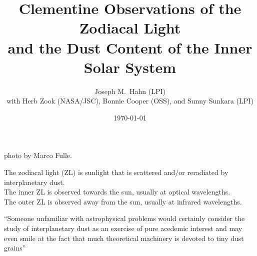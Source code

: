\documentclass[20pt,35mmSlide,landscape]{foils}
\title{\vspace*{-5ex}Clementine Observations of the Zodiacal
Light\\
and the Dust Content of the Inner Solar System\vspace*{1.5ex}}
\author{Joseph M.\ Hahn (LPI)\vspace*{4ex}\\
with Herb Zook (NASA/JSC), Bonnie Cooper (OSS),
and Sunny Sunkara (LPI)\vspace*{3ex}}
\date{\today}
\begin{document}
\maketitle

\pagecolor{light-yellow}

\begin{figure}
\vspace*{-0.75in}\centerline{}
\end{figure}

\pagecolor{light-yellow}

\parbox{10in}{
\parbox{5in}{
\begin{figure}[t]
\vspace*{-6ex}
\end{figure}
{\hspace{10ex}\footnotesize photo by Marco Fulle.}
}
\parbox[c]{4.5in}{

\vspace*{-4ex}The zodiacal light (ZL) is sunlight that is
scattered and/or reradiated by interplanetary dust.\\

The inner ZL is observed towards the sun,
usually at optical wavelengths.\\

The outer ZL is observed away from the sun,
usually at infrared wavelengths.
}
}

\pagecolor{light-yellow}

\begin{center}
\end{center}

``Someone unfamiliar with astrophysical problems would certainly
consider the study of interplanetary dust as an exercise of pure
acedemic interest and may even smile at the fact that much
theoretical machinery is devoted to tiny dust grains''
\end{document}

